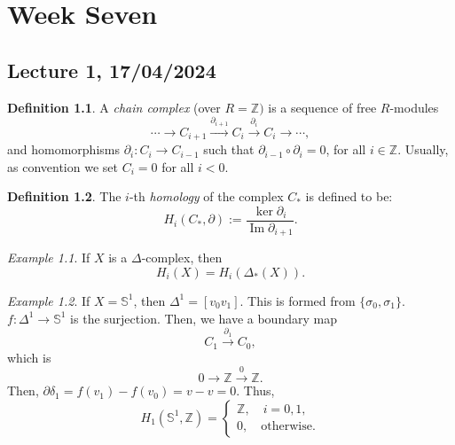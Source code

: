\documentclass[a4paper]{report}
\theoremstyle{definition}
\newtheorem{definition}{Definition}
\theoremstyle{remark}
\theoremstyle{proposition}
\theoremstyle{conjecture}
\theoremstyle{lemma}
\theoremstyle{corollary}
\theoremstyle{exercise}
\newtheorem{example}{Example}
\newcommand{\on}{\operatorname}
\begin{document}
\chapter{Week Seven}

\section{Lecture 1, 17/04/2024}

\begin{definition}
    A \emph{chain complex} (over $R = \mathbb{Z})$ is a sequence of free 
    $R$-modules 
    $$\cdots \longrightarrow C_{i+1} \stackrel{\partial_{i+1}}{\longrightarrow} C_i \stackrel{\partial_i}{\longrightarrow} C_i\longrightarrow \cdots,$$
    and homomorphisms $\partial_i : C_i \to C_{i-1}$ such that $\partial_{i-1} \circ \partial_i = 0$,
    for all $i\in \mathbb{Z}$. Usually, as convention we set $C_i = 0$ for all $i < 0$.
\end{definition}

\begin{definition}
    The $i$-th \emph{homology} of the complex $C_\ast$ is defined to be:
    $$H_i(C_\ast,\partial) := \frac{\ker \partial_i}{\on{Im} \partial_{i+1}}.$$
\end{definition}

\begin{example}
    If $X$ is a $\Delta$-complex, then 
    $$H_i(X) = H_i(\Delta_\ast(X)).$$
\end{example}

\begin{example}
    If $X = \mathbb{S}^1$, then $\Delta^1 = [v_0v_1]$. This is formed from 
    $\lbrace \sigma_0, \sigma_1\rbrace$.
    $f : \Delta^1 \to \mathbb{S}^1$ is the surjection. 
    Then, we have a boundary map 
    $$C_1 \stackrel{\partial_1}{\longrightarrow} C_0,$$
    which is 
    $$0 \longrightarrow \mathbb{Z} \stackrel{0}{\longrightarrow} \mathbb{Z}.$$
    Then, $\partial \delta_1 = f(v_1) - f(v_0) = v - v = 0$.
    Thus, 
    $$H_1(\mathbb{S}^1,\mathbb{Z}) = \begin{cases}
        \mathbb{Z},\quad i = 0,1,\\
        0,\quad \text{otherwise}.
    \end{cases}$$
\end{example}
\end{document}
